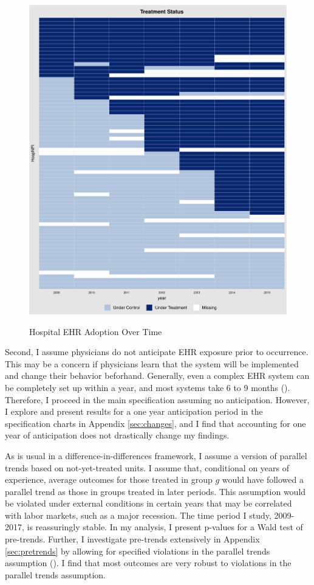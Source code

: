 \documentclass[12pt]{article}
\begin{document}
\begin{figure}[ht!]
    \centering
    \captionsetup{width=.7\linewidth}
    \caption{Hospital EHR Adoption Over Time}
    \includegraphics[scale=.5]{Objects/hosp_treat.pdf}
    \label{fig:hosp_treat}
\end{figure}

Second, I assume physicians do not anticipate EHR exposure prior to occurrence. This may be a concern if physicians learn that the system will be implemented and change their behavior beforhand. Generally, even a complex EHR system can be completely set up within a year, and most systems take 6 to 9 months (\cite{uzialko_2021}). Therefore, I proceed in the main specification assuming no anticipation. However, I explore and present results for a one year anticipation period in the specification charts in Appendix \ref{sec:changes}, and I find that accounting for one year of anticipation does not drastically change my findings.  

As is usual in a difference-in-differences framework, I assume a version of parallel trends based on not-yet-treated units. I assume that, conditional on years of experience, average outcomes for those treated in group $g$ would have followed a parallel trend as those in groups treated in later periods. This assumption would be violated under external conditions in certain years that may be correlated with labor markets, such as a major recession. The time period I study, 2009-2017, is reassuringly stable. In my analysis, I present p-values for a Wald test of pre-trends. Further, I investigate pre-trends extensively in Appendix \ref{sec:pretrends} by allowing for specified violations in the parallel trends assumption (\cite{rambachan2019honest}). I find that most outcomes are very robust to violations in the parallel trends assumption. 
\end{document}
